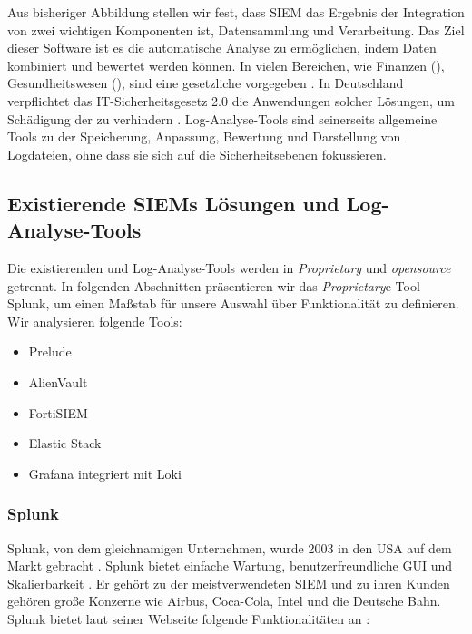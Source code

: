 Aus bisheriger Abbildung stellen wir fest, dass \gls{SIEM} das Ergebnis der Integration von zwei wichtigen Komponenten ist, Datensammlung und Verarbeitung. Das Ziel dieser Software ist es die automatische Analyse zu ermöglichen, indem Daten kombiniert und bewertet werden können. In vielen Bereichen, wie Finanzen (), Gesundheitswesen (), sind  eine gesetzliche vorgegeben \citep{Jog_SIEM}. In Deutschland verpflichtet das \gls{IT-Sicherheitsgesetz 2.0} die Anwendungen solcher Lösungen, um Schädigung der  zu verhindern \citep{BSI_ITSG}. Log-Analyse-Tools sind seinerseits allgemeine Tools zu der Speicherung, Anpassung, Bewertung und Darstellung von Logdateien, ohne dass sie sich auf die Sicherheitsebenen fokussieren.

\subsection{Existierende SIEMs Lösungen und Log-Analyse-Tools}
Die existierenden  und Log-Analyse-Tools werden in \textit{\gls{Proprietary}} und \textit{\gls{opensource}} getrennt. In folgenden Abschnitten präsentieren wir das \textit{\gls{Proprietary}}e Tool Splunk, um einen Maßstab für unsere Auswahl über Funktionalität zu definieren. Wir analysieren folgende Tools: %

\begin{itemize}[noitemsep]
   \item Prelude %
   \item AlienVault  %
   \item FortiSIEM %
   \item Elastic Stack %
   \item Grafana integriert mit Loki %
\end{itemize}

\subsubsection{Splunk}
Splunk, von dem gleichnamigen Unternehmen, wurde 2003 in den USA auf dem Markt gebracht \citep{Splunk_splunk}. Splunk bietet einfache Wartung, benutzerfreundliche \gls{GUI} und Skalierbarkeit \citep{Kazarov_Splunk}. Er gehört zu der meistverwendeten \gls{SIEM} und zu ihren Kunden gehören große Konzerne wie Airbus, Coca-Cola, Intel und die Deutsche Bahn. Splunk bietet laut seiner Webseite folgende Funktionalitäten an \citep{Splunk_SPE}:

